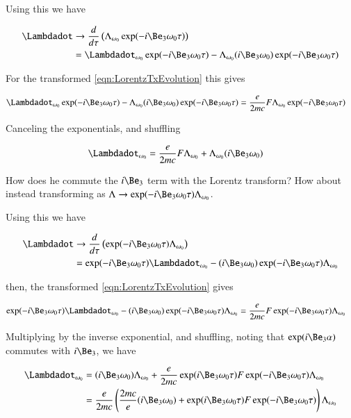\documentclass{article}
\begin{document}
Using this we have

\begin{align*}
\Lambdadot 
&\rightarrow \frac{d}{d\tau}\left(\Lambda_{\omega_0} \exp( -i \Be_3 \omega_0 \tau) \right) \\
&= \Lambdadot_{\omega_0} \exp( -i \Be_3 \omega_0 \tau) 
- \Lambda_{\omega_0} ( i \Be_3 \omega_0 ) \exp( -i \Be_3 \omega_0 \tau) 
\end{align*}

For the transformed \ref{eqn:LorentzTxEvolution} this gives

\begin{align*}
\Lambdadot_{\omega_0} \exp( -i \Be_3 \omega_0 \tau) 
- \Lambda_{\omega_0} ( i \Be_3 \omega_0 ) \exp( -i \Be_3 \omega_0 \tau) 
&= \frac{e}{2 m c} F \Lambda_{\omega_0} \exp( -i \Be_3 \omega_0 \tau)
\end{align*}

Canceling the exponentials, and shuffling

\begin{align*}
\Lambdadot_{\omega_0} 
&= \frac{e}{2 m c} F \Lambda_{\omega_0} + \Lambda_{\omega_0} ( i \Be_3 \omega_0 ) 
\end{align*}

How does he commute the $i\Be_3$ term with the Lorentz transform?  How about instead 
transforming as
$\Lambda \rightarrow \exp( -i \Be_3 \omega_0 \tau) \Lambda_{\omega_0}$.

Using this we have

\begin{align*}
\Lambdadot 
&\rightarrow \frac{d}{d\tau}\left(
\exp( -i \Be_3 \omega_0 \tau) 
\Lambda_{\omega_0} 
\right) \\
&= 
\exp( -i \Be_3 \omega_0 \tau) 
\Lambdadot_{\omega_0} 
- 
( i \Be_3 \omega_0 ) \exp( -i \Be_3 \omega_0 \tau) 
\Lambda_{\omega_0} 
\end{align*}

then, the transformed \ref{eqn:LorentzTxEvolution} gives

\begin{align*}
\exp( -i \Be_3 \omega_0 \tau) 
\Lambdadot_{\omega_0} 
- 
( i \Be_3 \omega_0 ) \exp( -i \Be_3 \omega_0 \tau) 
\Lambda_{\omega_0} 
&= \frac{e}{2 m c} F 
\exp( -i \Be_3 \omega_0 \tau)
\Lambda_{\omega_0} 
\end{align*}

Multiplying by the inverse exponential, and shuffling, noting that $\exp(i\Be_3\alpha)$ commutes with $i\Be_3$, we have

\begin{align*}
\Lambdadot_{\omega_0} 
&= 
( i \Be_3 \omega_0 ) \Lambda_{\omega_0} 
+ \frac{e}{2 m c} 
\exp( i \Be_3 \omega_0 \tau) 
F 
\exp( -i \Be_3 \omega_0 \tau)
\Lambda_{\omega_0}  \\
&=
\frac{e}{2 m c} \left(
\frac{2 m c}{e} ( i \Be_3 \omega_0 ) 
+ 
\exp( i \Be_3 \omega_0 \tau) 
F 
\exp( -i \Be_3 \omega_0 \tau)
\right)
\Lambda_{\omega_0} 
\end{align*}
\end{document}
